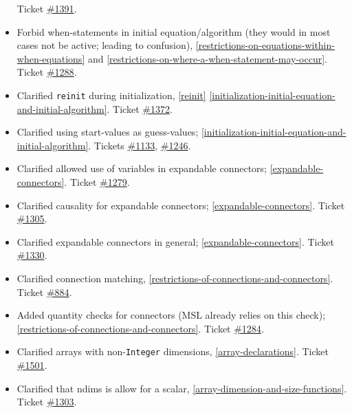 \begin{itemize}
  Ticket \href{https://github.com/modelica/ModelicaSpecification/issues/1391}{\#1391}.
\item
  Forbid when-statements in initial equation/algorithm (they would in
  most cases not be active; leading to confusion), \cref{restrictions-on-equations-within-when-equations} and
  \cref{restrictions-on-where-a-when-statement-may-occur}. Ticket
  \href{https://github.com/modelica/ModelicaSpecification/issues/1288}{\#1288}.
\item
  Clarified \lstinline!reinit! during initialization, \cref{reinit} \cref{initialization-initial-equation-and-initial-algorithm}.
  Ticket \href{https://github.com/modelica/ModelicaSpecification/issues/1372}{\#1372}.
\item
  Clarified using start-values as guess-values; \cref{initialization-initial-equation-and-initial-algorithm}. Tickets
  \href{https://github.com/modelica/ModelicaSpecification/issues/1133}{\#1133},
  \href{https://github.com/modelica/ModelicaSpecification/issues/1246}{\#1246}.
\item
  Clarified allowed use of variables in expandable connectors; \cref{expandable-connectors}. Ticket
  \href{https://github.com/modelica/ModelicaSpecification/issues/1279}{\#1279}.
\item
  Clarified causality for expandable connectors; \cref{expandable-connectors}. Ticket
  \href{https://github.com/modelica/ModelicaSpecification/issues/1305}{\#1305}.
\item
  Clarified expandable connectors in general; \cref{expandable-connectors}. Ticket
  \href{https://github.com/modelica/ModelicaSpecification/issues/1330}{\#1330}.
\item
  Clarified connection matching, \cref{restrictions-of-connections-and-connectors}. Ticket
  \href{https://github.com/modelica/ModelicaSpecification/issues/884}{\#884}.
\item
  Added quantity checks for connectors (MSL already relies on this
  check); \cref{restrictions-of-connections-and-connectors}. Ticket
  \href{https://github.com/modelica/ModelicaSpecification/issues/1284}{\#1284}.
\item
  Clarified arrays with non-\lstinline!Integer! dimensions, \cref{array-declarations}.
  Ticket \href{https://github.com/modelica/ModelicaSpecification/issues/1501}{\#1501}.
\item
  Clarified that ndims is allow for a scalar, \cref{array-dimension-and-size-functions}. Ticket
  \href{https://github.com/modelica/ModelicaSpecification/issues/1303}{\#1303}.

\end{itemize}
